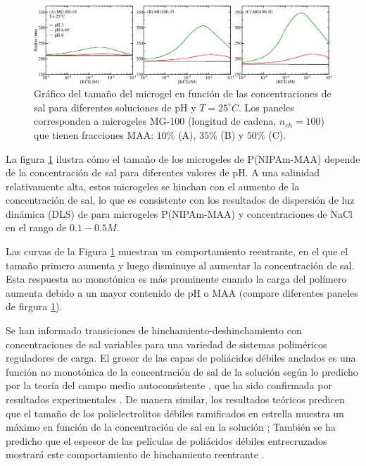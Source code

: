 \begin{figure}[!htb]
	\centering
	\includegraphics[width=1\linewidth]{Figures/graph-gel/R-cs.png}
	\caption{Gr\'afico del tama\~no del microgel en funci\'on de las concentraciones de sal para diferentes soluciones de pH y $T=25 ^\circ C$.
		Los paneles corresponden a microgeles MG-100 (longitud de cadena, $n_{ch}=100$) que tienen fracciones MAA: $10\%$ (A), $35\%$ (B) y $50\%$ (C).}
	\label{fig:R-cs}
\end{figure}

La figura \ref{fig:R-cs} ilustra c\'omo el tama\~no de los microgeles de P(NIPAm-MAA) depende de la concentraci\'on de sal para diferentes valores de pH.
A una salinidad relativamente alta, estos microgeles se hinchan con el aumento de la concentraci\'on de sal, lo que es consistente con los resultados de dispersi\'on de luz din\'amica (DLS) de  para microgeles P(NIPAm-MAA) y concentraciones de NaCl en el rango de $0.1-0.5 M$.

Las curvas de la Figura \ref{fig:R-cs} muestran un comportamiento reentrante, en el que el tama\~no primero aumenta y luego disminuye al aumentar la concentración de sal.
Esta respuesta no monot\'onica es m\'as prominente cuando la carga del pol\'imero aumenta debido a un mayor contenido de pH o MAA (compare diferentes paneles de firgura \ref{fig:R-cs}).



Se han informado transiciones de hinchamiento-deshinchamiento con concentraciones de sal variables para una variedad de sistemas polim\'ericos reguladores de carga.
El grosor de las capas de poli\'acidos d\'ebiles anclados es una funci\'on no monot\'onica de la concentraci\'on de sal de la soluci\'on seg\'un lo predicho por la teor\'ia del campo medio autoconsistente , que ha sido confirmada por resultados experimentales \addcite [Wu2007].
De manera similar, los resultados te\'oricos predicen que el tama\~no de los polielectrolitos d\'ebiles ramificados en estrella muestra un m\'aximo en funci\'on de la concentraci\'on de sal en la soluci\'on ;
Tambi\'en se ha predicho que el espesor de las pel\'iculas de poliácidos d\'ebiles entrecruzados mostrar\'a este comportamiento de hinchamiento reentrante .

